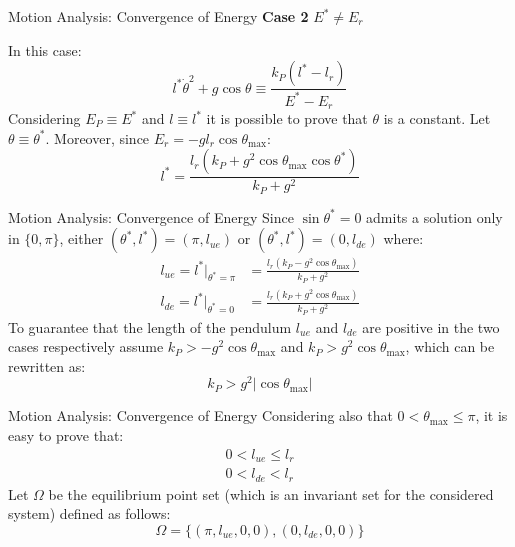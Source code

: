 \documentclass[10pt]{beamer}
\begin{document}
  \begin{frame}{Motion Analysis: Convergence of Energy}
    \noindent \textbf{Case 2} $E^* \neq E_r$

    In this case:
    \begin{equation*}
      l^* \dot{\theta}^2 + g\cos\theta \equiv \frac{k_P(l^*-l_r)}{E^*-E_r}
    \end{equation*}
    Considering $E_P \equiv E^*$ and $l \equiv l^*$ it is possible to prove
    that $\theta$ is a constant. Let $\theta \equiv \theta^*$. Moreover,
    since $E_r = -g l_r \cos\theta_{\max}$:
    \begin{equation*}
      l^* = \frac{l_r(k_P+g^2\cos\theta_{\max}\cos\theta^*)}{k_P+g^2}
    \end{equation*}
  \end{frame}

  \begin{frame}{Motion Analysis: Convergence of Energy}
    Since $\sin\theta^*=0$ admits a solution only in
    $\{0, \pi\}$, either $(\theta^*, l^*)=(\pi, l_{ue})$ or $(\theta^*,
    l^*)=(0, l_{de})$ where:
    \begin{align*}
      l_{ue} = l^*\rvert_{\theta^*=\pi} &=
        \frac{l_r(k_P-g^2\cos\theta_{\max})}{k_P+g^2} \\
        l_{de} = l^*\rvert_{\theta^*=0} &=
        \frac{l_r(k_P+g^2\cos\theta_{\max})}{k_P+g^2}
    \end{align*}
    To guarantee that the length
    of the pendulum $l_{ue}$ and $l_{de}$ are positive in the two
    cases respectively assume $k_P>-g^2\cos\theta_{\max}$ and
    $k_P>g^2\cos\theta_{\max}$, which can be rewritten as:
    \begin{equation*}
      k_P > g^2 |\cos\theta_{\max}|
    \end{equation*}
  \end{frame}

  \begin{frame}{Motion Analysis: Convergence of Energy}
    Considering also that $0 < \theta_{\max} \le \pi$,
    it is easy to prove that:
    \begin{gather*}
        0 < l_{ue} \le l_r \\ 0 < l_{de} < l_r
    \end{gather*}
    Let $\Omega$ be the equilibrium point set (which is an
    invariant set for the considered system) defined as follows:
    \begin{equation*}
      \Omega = \{ (\pi, l_{ue}, 0, 0), (0, l_{de}, 0, 0) \}
    \end{equation*}
  \end{frame}
\end{document}
